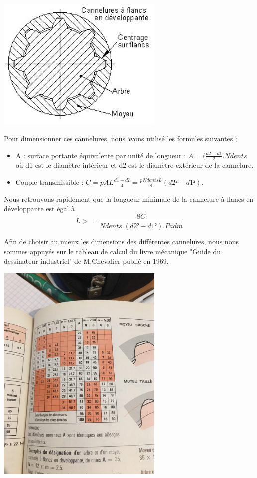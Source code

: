 \documentclass{config}
\begin{document}
\begin{spacing}{1.2}
\begin{center}
\includegraphics[width=0.6\textwidth]{cannelure_developpante.jpg}
\end{center}

Pour dimensionner ces cannelures, nous avons utilisé les formules suivantes ;
\begin{itemize}
    \item A : surface portante équivalente par unité de longueur : $A = (\frac{d2-d1}{2}.Ndents$ où d1 est le diamètre intérieur et d2 est le diamètre extérieur de la cannelure.
    \item Couple transmissible : $C = p A L \frac{d1+d2}{4} = \frac{p Ndents L}{8} (d2² - d1²)$.
\end{itemize}
Nous retrouvons rapidement que la longueur minimale de la cannelure à flancs en développante est égal à 
\[ L >= \frac{8 C}{Ndents.(d2² - d1²). Padm}\]

Afin de choisir au mieux les dimensions des différentes cannelures, nous nous sommes appuyés sur le tableau de calcul du livre mécanique "Guide du dessinateur industriel" de M.Chevalier publié en 1969.

\begin{center}
\includegraphics[width=0.6\textwidth]{guide_dessin_indus_cannelure_dev.jpg}
\end{center}


\end{spacing}
\end{document}
